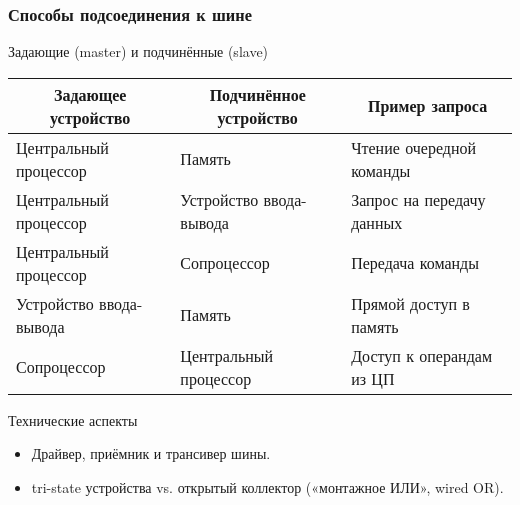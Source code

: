 \begin{frame}
\frametitle{Способы подсоединения к шине}
\begin{block}{Задающие (master) и подчинённые (slave)}
\footnotesize
\begin{table}[h]
\begin{tabular}{@{}lll@{}}
\toprule
\multicolumn{1}{c}{\textbf{Задающее устройство}} & \multicolumn{1}{c}{\textbf{Подчинённое устройство}} & \multicolumn{1}{c}{\textbf{Пример запроса}} \\ \midrule
Центральный процессор                            & Память                                              & Чтение очередной команды         \\
Центральный процессор                            & Устройство ввода-вывода                             & Запрос на передачу данных                   \\
Центральный процессор                            & Сопроцессор                                         & Передача команды                            \\
Устройство ввода-вывода                          & Память                                              & Прямой доступ в память                \\
Сопроцессор                                      & Центральный процессор                               & Доступ к операндам из ЦП                    \\ \bottomrule
\end{tabular}
\end{table}

\end{block}

\pause
\begin{block}{Технические аспекты}
\begin{itemize}[<+->]
    \item Драйвер, приёмник и трансивер шины.
    \item tri-state устройства vs. открытый коллектор («монтажное ИЛИ», wired OR).
\end{itemize}
\end{block}
\end{frame}

